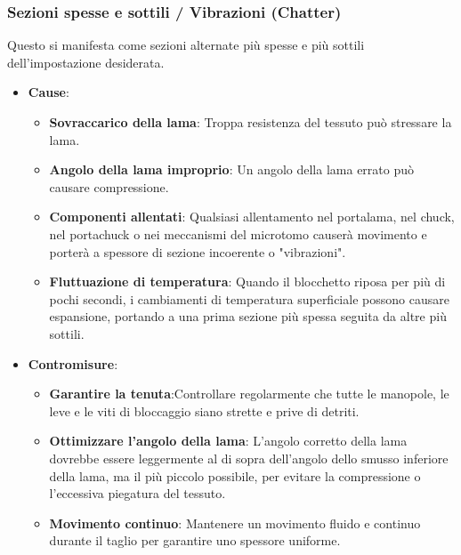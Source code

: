 \subsubsection{Sezioni spesse e sottili / Vibrazioni (Chatter)}
Questo si manifesta come sezioni alternate più spesse e più sottili dell'impostazione desiderata. 
\begin{itemize}
    \item   \textbf{Cause}:
    \begin{itemize}
        \item   \textbf{Sovraccarico della lama}: Troppa resistenza del tessuto può stressare la lama. 
        \item   \textbf{Angolo della lama improprio}: Un angolo della lama errato può causare compressione. 
        \item   \textbf{Componenti allentati}: Qualsiasi allentamento nel portalama, nel chuck, nel portachuck o nei meccanismi del microtomo causerà movimento e porterà a spessore di sezione incoerente o "vibrazioni". 
        \item   \textbf{Fluttuazione di temperatura}: Quando il blocchetto riposa per più di pochi secondi, i cambiamenti di temperatura superficiale possono causare espansione, portando a una prima sezione più spessa seguita da altre più sottili. 
    \end{itemize}
    \item   \textbf{Contromisure}:
    \begin{itemize}
        \item   \textbf{Garantire la tenuta}:Controllare regolarmente che tutte le manopole, le leve e le viti di bloccaggio siano strette e prive di detriti. 
        \item   \textbf{Ottimizzare l'angolo della lama}: L'angolo corretto della lama dovrebbe essere leggermente al di sopra dell'angolo dello smusso inferiore della lama, ma il più piccolo possibile, per evitare la compressione o l'eccessiva piegatura del tessuto. 
        \item   \textbf{Movimento continuo}: Mantenere un movimento fluido e continuo durante il taglio per garantire uno spessore uniforme. 
    \end{itemize}
\end{itemize}

